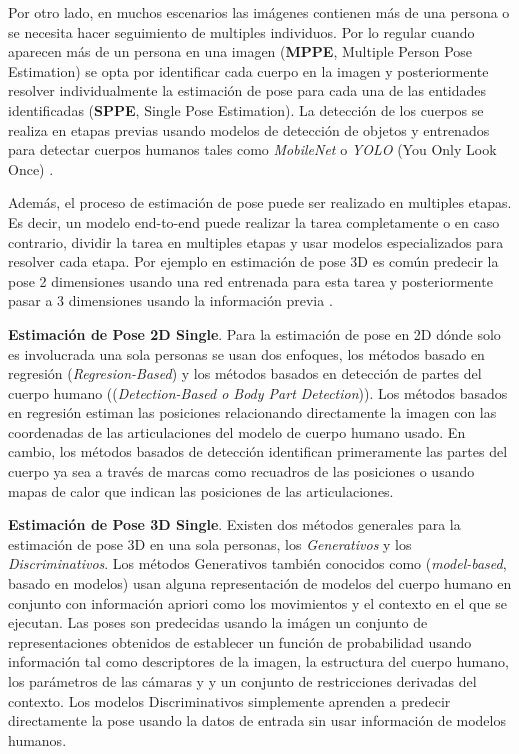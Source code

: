 Por otro lado, en muchos escenarios las imágenes contienen más de una persona o se necesita hacer seguimiento
de multiples individuos. Por lo regular cuando aparecen más de un persona en una imagen
(\textbf{MPPE}, Multiple Person Pose Estimation)
se opta por identificar cada cuerpo en la imagen y posteriormente resolver individualmente
la estimación de pose para cada una de las entidades identificadas (\textbf{SPPE}, Single Pose Estimation).
La detección de los cuerpos se realiza en
etapas previas usando modelos de detección de objetos y entrenados para detectar cuerpos
humanos tales como \textit{MobileNet} \cite{DBLP:journals/corr/RenHG015}
\cite{DBLP:journals/corr/HowardZCKWWAA17} \cite{DBLP:journals/corr/abs-1801-04381} o \textit{YOLO}
(You Only Look Once) \cite{DBLP:journals/corr/RedmonDGF15} \cite{DBLP:journals/corr/abs-2004-10934}.

Además, el proceso de estimación de pose puede ser realizado en multiples etapas. Es decir, un modelo
end-to-end puede realizar la tarea completamente o en caso contrario, dividir la tarea en multiples
etapas y usar modelos especializados para resolver cada etapa. Por ejemplo en estimación de pose 3D
es común predecir la pose 2 dimensiones usando una red entrenada para esta tarea y posteriormente
pasar a 3 dimensiones usando la información previa \cite{DBLP:journals/corr/MartinezHRL17}.

\textbf{Estimación de Pose 2D Single}.
Para la estimación de pose en 2D dónde solo es involucrada una sola personas se usan dos enfoques,
los métodos basado en regresión (\textit{Regresion-Based}) y los métodos basados en detección de
partes del cuerpo humano ((\textit{Detection-Based o Body Part Detection})). Los métodos basados en
regresión estiman las posiciones relacionando directamente la imagen con las coordenadas de las
articulaciones del modelo de cuerpo humano usado. En cambio, los métodos basados de detección
identifican primeramente las partes del cuerpo ya sea a través de marcas como recuadros de las
posiciones o usando mapas de calor que indican las posiciones de las articulaciones.

\textbf{Estimación de Pose 3D Single}.
Existen dos métodos generales para la estimación de pose 3D en una sola personas, los
\textit{Generativos} y los \textit{Discriminativos}. Los métodos Generativos
también conocidos como (\textit{model-based}, basado en modelos) usan alguna representación de modelos
del cuerpo humano en conjunto con información apriori como los movimientos y el contexto en el que se
ejecutan. Las poses son predecidas usando la imágen un conjunto de representaciones obtenidos de establecer un
función de probabilidad usando información tal como descriptores de la imagen, la estructura del cuerpo
humano, los parámetros de las cámaras y y un conjunto de restricciones derivadas del contexto. Los
modelos Discriminativos simplemente aprenden a predecir directamente la pose usando la datos de entrada
sin usar información de modelos humanos.

